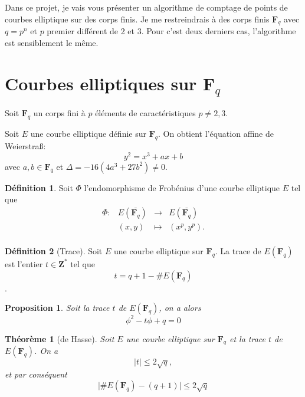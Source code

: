 \documentclass{article}%
\theoremstyle{plain}
\newtheorem{theoreme}{Théorème}[section]
\theoremstyle{definition}
\newtheorem{definition}{Définition}[section]
\theoremstyle{plain}
\newtheorem{proposition}{Proposition}[section]
\theoremstyle{plain}
\theoremstyle{remark}
\newcommand\fq{\mathbf{F}_{q}}
\begin{document}
Dans ce projet, je vais vous présenter un algorithme de comptage de points de courbes elliptique sur des corps finis. Je me restreindrais à des corps finis $\fq$ avec $q=p^{n}$ et $p$ premier différent de 2 et 3. Pour c'est deux derniers cas, l'algorithme est sensiblement le même. 

\section{Courbes elliptiques sur $\fq$}

Soit $\fq$ un corps fini à $p$ éléments de caractéristiques $p\neq 2,3$.

Soit $E$ une courbe elliptique définie sur $\fq$. On obtient l'équation affine de Weierstra\ss : 
\begin{equation}
y^{2} = x^{3} + ax + b
\end{equation} 
avec $a,b\in\fq$ et $\Delta = -16(4a^{3} + 27b^{2}) \neq 0$.

\begin{definition}
Soit $\varPhi$ l'endomorphisme de Frobénius d'une courbe elliptique $E$ tel que  
$$\begin{array}{clcl}
\varPhi : &E(\bar{\fq}) &\longrightarrow &E(\bar{\fq})\\
&(x, y) &\longmapsto	&(x^{p}, y^{p}).\\
\end{array}$$
\end{definition}

\begin{definition}[Trace]
Soit $E$ une courbe elliptique sur $\fq$. La trace de $E(\fq)$ est l'entier $t\in\mathbf{Z^{*}}$ tel que  
\begin{equation}
t=q+1-\#E(\fq)
\label{trace}
\end{equation}.
\end{definition}

\begin{proposition}
Soit la trace $t$ de $E(\fq)$, on a alors 
\begin{equation}
\phi^{2} - t\phi + q = 0
\label{trace1}
\end{equation}
\end{proposition}

\begin{theoreme}[de Hasse]
Soit $E$ une courbe elliptique sur $\fq$ et la trace $t$ de $E(\fq)$.
On a \begin{equation}
\mid t\mid\leq 2\sqrt{q},
\label{hasse}
\end{equation}
et par conséquent
\begin{equation}
\mid\#E(\fq)-(q+1)\mid\leq 2\sqrt{q}
\label{hasse1}
\end{equation}
\end{theoreme}
\end{document}
